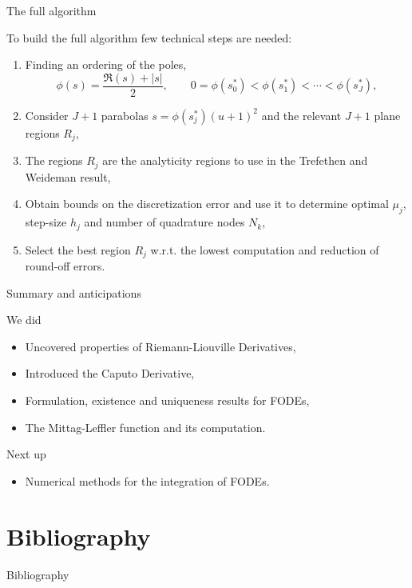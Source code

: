 \documentclass[aspectratio=169,xcolor=dvipsnames]{beamer}
\newcommand\unnumbered{\setbeamertemplate{footline}{}}%
\begin{document}
\begin{frame}{The full algorithm \parencite{Garrappa}}

To build the full algorithm few technical steps are needed:
\begin{enumerate}
	\item<1-> Finding an ordering of the poles,
	\[
	\phi(s) = \frac{\Re(s) + |s|}{2}, \qquad 0 = \phi(s_0^*) < \phi(s_1^*) < \cdots < \phi(s_J^*), 
	\]
	\item<2-> Consider $J+1$ parabolas $s = \phi(s^*_j) (u + 1)^2$ and the relevant $J+1$ plane regions $R_j$,
	\item<3-> The regions $R_j$ are the analyticity regions to use in the Trefethen and Weideman result,
	\item<4-> Obtain bounds on the discretization error and use it to determine optimal $\mu_j$, step-size $h_j$ and number of quadrature nodes $N_k$,
	\item<5-> Select the best region $R_j$ w.r.t. the lowest computation and reduction of round-off errors.
\end{enumerate}


\end{frame}

\begin{frame}{Summary and anticipations}

We did
\begin{itemize}
	\item[\textcolor{success}{\faCheckCircle}] Uncovered properties of Riemann-Liouville Derivatives,
	\item[\textcolor{success}{\faCheckCircle}] Introduced the Caputo Derivative,
	\item[\textcolor{success}{\faCheckCircle}] Formulation, existence and uniqueness results for FODEs,
	\item[\textcolor{success}{\faCheckCircle}] The Mittag-Leffler function and its computation.
\end{itemize}
Next up
\begin{itemize}
	\item[\textcolor{todo}{\faClipboardList}] Numerical methods for the integration of FODEs.
\end{itemize}
\end{frame}

\appendix

\section*{Bibliography}
{\unnumbered
\begin{frame}{Bibliography}
\small
\printbibliography

\end{frame}
}
\end{document}
